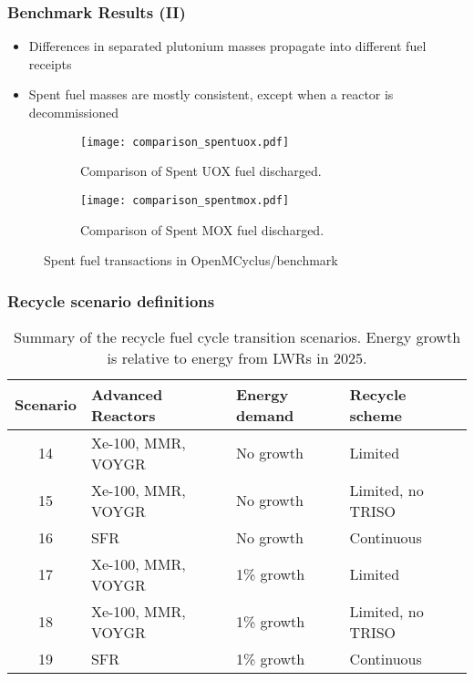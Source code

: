 \begin{frame}
    \frametitle{Benchmark Results (II)}
        \begin{itemize}
            \item Differences in separated plutonium masses 
                  propagate into different fuel receipts 
            \item Spent fuel masses are mostly consistent, except 
                  when a reactor is decommissioned
        \end{itemize}
        \begin{figure}
            \centering
            \begin{subfigure}{0.48\textwidth}
                \texttt{[image: comparison\_spentuox.pdf]}
                \caption{Comparison of Spent UOX fuel discharged.}
            \end{subfigure}
            \hfill
            \begin{subfigure}{0.48\textwidth}
                \texttt{[image: comparison\_spentmox.pdf]}
                \caption{Comparison of Spent MOX fuel discharged.}
            \end{subfigure}
            \caption{Spent fuel transactions in OpenMCyclus/\Cycamore benchmark}
            \label{fig:spentfuel_benchmark}
        \end{figure}

\end{frame}

\begin{frame}
    \frametitle{Recycle scenario definitions}
    \begin{table}[ht]
        \centering
        \caption{Summary of the recycle fuel cycle transition scenarios.
        Energy growth is relative to energy from \glspl{LWR} in 2025.}
        \label{tab:scenarios_recycle}
        \begin{tabular}{c l l l}
            \hline
            Scenario & Advanced Reactors & Energy demand & Recycle scheme\\\hline
            \rowcolor{lightorange}14 & Xe-100, MMR, VOYGR & No growth & Limited \\
            \rowcolor{lightorange}15 & Xe-100, MMR, VOYGR & No growth & Limited, no TRISO\\
            \rowcolor{lightorange}16 & SFR& No growth & Continuous \\
            \rowcolor{lightpink}17 & Xe-100, MMR, VOYGR & 1\% growth & Limited \\
            \rowcolor{lightpink}18 & Xe-100, MMR, VOYGR & 1\% growth & Limited, no TRISO\\
            \rowcolor{lightpink}19 & SFR & 1\% growth & Continuous\\
            \hline
    \end{tabular}
    \end{table}
\end{frame}


